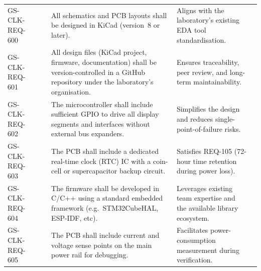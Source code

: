 \begin{landscape}
\begin{longtable}{C{3.5cm} C{2.4cm} C{1.7cm} L{8.5cm} L{5.7cm} C{2.5cm}}
    GS-CLK-REQ-600 &  & 
        & All schematics and PCB layouts shall be designed in KiCad (version~8 or later).
        & Aligns with the laboratory's existing EDA tool standardisation.
        &  \\[2pt]

    GS-CLK-REQ-601 &  & 
        & All design files (KiCad project, firmware, documentation) shall be version-controlled in a GitHub repository under the laboratory's organisation.
        & Ensures traceability, peer review, and long-term maintainability.
        &  \\[2pt]

    GS-CLK-REQ-602 &  & 
        & The microcontroller shall include sufficient GPIO to drive all display segments and interfaces without external bus expanders.
        & Simplifies the design and reduces single-point-of-failure risks.
        &  \\[2pt]

    GS-CLK-REQ-603 &  & 
        & The PCB shall include a dedicated real-time clock (RTC) IC with a coin-cell or supercapacitor backup circuit.
        & Satisfies REQ-105 (72-hour time retention during power loss).
        &  \\[2pt]

    GS-CLK-REQ-604 &  & 
        & The firmware shall be developed in C/C++ using a standard embedded
        framework (e.g.\ STM32CubeHAL, ESP-IDF, etc).
        & Leverages existing team expertise and the available library ecosystem.
        &  \\[2pt]

    GS-CLK-REQ-605 &  & 
        & The PCB shall include current and voltage sense points on the main power rail for debugging.
        & Facilitates power-consumption measurement during verification.
        &  \\[2pt]


\end{longtable}
\end{landscape}
